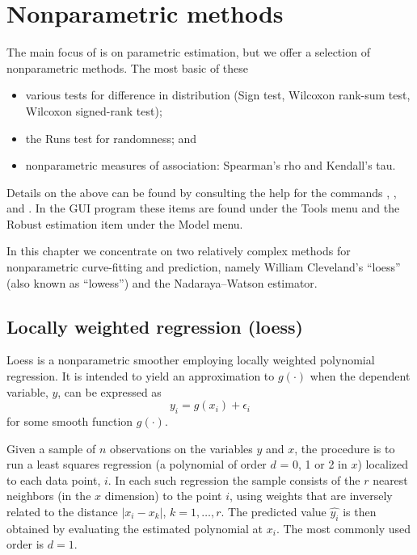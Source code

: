 \chapter{Nonparametric methods}
\label{chap-nonparam}

The main focus of  is on parametric estimation, but we offer a
selection of nonparametric methods. The most basic of these
%
\begin{itemize}
\item various tests for difference in distribution (Sign test,
  Wilcoxon rank-sum test, Wilcoxon signed-rank test);
\item the Runs test for randomness; and
\item nonparametric measures of association: Spearman's rho and
  Kendall's tau.
\end{itemize}

Details on the above can be found by consulting the help for the
commands , ,  and .
In the GUI program these items are found under the \textsf{Tools} menu
and the \textsf{Robust estimation} item under the \textsf{Model} menu.

In this chapter we concentrate on two relatively complex methods for
nonparametric curve-fitting and prediction, namely William
Cleveland's ``loess'' (also known as ``lowess'') and the
Nadaraya--Watson estimator.

\section{Locally weighted regression (loess)}
\label{sec:loess}

Loess \citep{cleveland79} is a nonparametric smoother employing
locally weighted polynomial regression. It is intended to yield an
approximation to $g(\cdot)$ when the dependent variable, $y$, can be
expressed as
\[
y_i = g(x_i) + \epsilon_i
\]
for some smooth function $g(\cdot)$.

Given a sample of $n$ observations on the variables $y$ and $x$, the
procedure is to run a least squares regression (a polynomial of order
$d$ = 0, 1 or 2 in $x$) localized to each data point, $i$. In each
such regression the sample consists of the $r$ nearest neighbors (in
the $x$ dimension) to the point $i$, using weights that are inversely
related to the distance $|x_i - x_k|$, $k=1,\dots,r$. The predicted
value $\hat{y_i}$ is then obtained by evaluating the estimated
polynomial at $x_i$. The most commonly used order is $d=1$.

